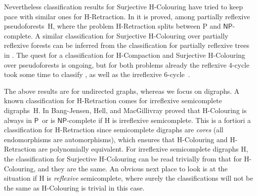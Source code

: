 \documentclass[a4paper,12pt]{article}
\theoremstyle{remark}
\newcommand{\NP}[0]{\ensuremath{\mathsf{NP}}}
\newcommand{\Ptime}[0]{\ensuremath{\mathsf{P}}}
\renewcommand{\H}{\ensuremath{\mathrm{H}}}
\begin{document}
Nevertheless classification results for {\sc Surjective $\H$-Colouring} have tried to keep pace with similar ones for  {\sc $\H$-Retraction}. In \cite{pseudoforests} it is proved, among partially reflexive pseudoforests~$\H$, where the problem {\sc $\H$-Retraction} splits between P and \NP-complete. A similar classification for {\sc Surjective $\H$-Colouring} over partially reflexive forests can be inferred from the classification for partially reflexive trees in \cite{GolovachPS12}. The quest for a classification for {\sc $\H$-Compaction} and {\sc Surjective $\H$-Colouring} over pseudoforests is ongoing, but for both problems already the reflexive $4$-cycle took some time to classify \cite{JCTBMartinPaulusma,VikasReflexive}, as well as the irreflexive $6$-cycle~\cite{VikasIrreflexive,VikasMFCS}. 

The above results are for undirected graphs, whereas we focus on digraphs.
A known classification for {\sc $\H$-Retraction} comes for irreflexive semicomplete digraphs~$\H$. In \cite{Semicomplete}
Bang-Jensen, Hell, and MacGillivray proved that {\sc $\H$-Colouring} is always in \Ptime\ or is \NP-complete if $\H$ is irreflexive semicomplete. This is a fortiori a classification for {\sc $\H$-Retraction} since semicomplete digraphs are \emph{cores} (all endomorphisms are automorphisms), which ensures that {\sc $\H$-Colouring} and {\sc $\H$-Retraction} are polynomially equivalent. 
For irreflexive semicomplete digraphs $\H$, the classification for {\sc Surjective $\H$-Colouring} can be read trivially from that for {\sc $\H$-Colouring}, and they are the same. An obvious next place to look 
is at
the situation if $\H$ is {\it reflexive} semicomplete, where surely the classifications will not be the same as {\sc $\H$-Colouring} is trivial in this case. 
\end{document}
